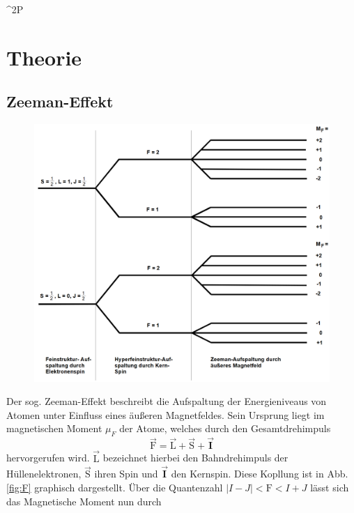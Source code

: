 ^2{P}\section{Theorie}
\label{sec:Theorie}

\subsection{Zeeman-Effekt}
\begin{figure}
  \includegraphics{./Niveaus.PNG}
  \caption{\cite{Anleitung}}
  \label{fig:Zeemann}
\end{figure}
Der sog. Zeeman-Effekt beschreibt die Aufspaltung der Energieniveaus von Atomen unter Einfluss eines äußeren Magnetfeldes.
Sein Ursprung liegt im magnetischen Moment $\mu_F$ der Atome, welches durch den Gesamtdrehimpuls
\begin{equation}
  \vec{\text{F}}=\vec{\text{L}}+\vec{\text{S}}+\vec{\mathbf{I}}
  \label{eqn:F}
\end{equation}
hervorgerufen wird. $\vec{\text{L}}$ bezeichnet hierbei den Bahndrehimpuls der Hüllenelektronen, $\vec{\text{S}}$ ihren Spin und $\vec{\mathbf{I}}$ den Kernspin. Diese Kopllung ist in Abb. \ref{fig:F} graphisch dargestellt.
Über die Quantenzahl $|I-J|<\text{F}<I+J$ lässt sich das Magnetische Moment nun durch


